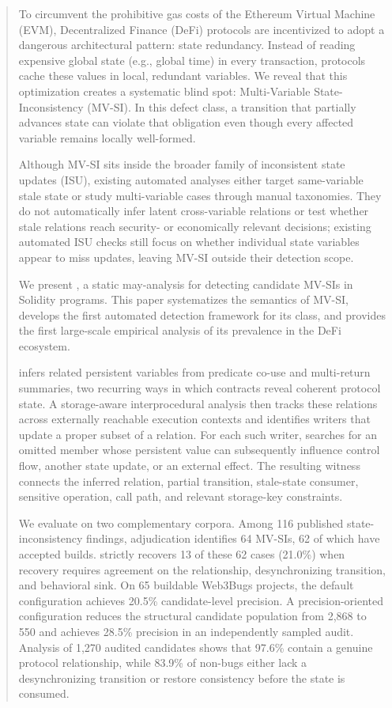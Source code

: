 \begin{abstract}

To circumvent the prohibitive gas costs of the Ethereum Virtual Machine (EVM), Decentralized Finance (DeFi) protocols are incentivized to adopt a dangerous architectural pattern: state redundancy. Instead of reading expensive global state (e.g., global time) in every transaction, protocols cache these values in local, redundant variables. We reveal that this optimization creates a systematic blind spot: Multi-Variable State-Inconsistency (MV-SI). In this defect class, a transition that partially advances state can violate that obligation even though every affected variable remains locally well-formed.

Although MV-SI sits inside the broader family of inconsistent state updates (ISU), existing automated analyses either target same-variable stale state or study multi-variable cases through manual taxonomies. They do not automatically infer latent cross-variable relations or test whether stale relations reach security- or economically relevant decisions; existing automated ISU checks still focus on whether individual state variables appear to miss updates, leaving MV-SI outside their detection scope.

We present \tool, a static may-analysis for detecting candidate MV-SIs in Solidity programs. This paper systematizes the semantics of MV-SI, develops the first automated detection framework for its class, and provides the first large-scale empirical analysis of its prevalence in the DeFi ecosystem.

\tool infers related persistent variables from predicate co-use and multi-return summaries, two recurring ways in which contracts reveal coherent protocol state. A storage-aware interprocedural analysis then tracks these relations across externally reachable execution contexts and identifies writers that update a proper subset of a relation. For each such writer, \tool searches for an omitted member whose persistent value can subsequently influence control flow, another state update, or an external effect. The resulting witness connects the inferred relation, partial transition, stale-state consumer, sensitive operation, call path, and relevant storage-key constraints.

We evaluate \tool on two complementary corpora. Among 116 published state-inconsistency findings, adjudication identifies 64 MV-SIs, 62 of which have accepted builds. \tool strictly recovers 13 of these 62 cases (21.0\%) when recovery requires agreement on the relationship, desynchronizing transition, and behavioral sink. On 65 buildable Web3Bugs projects, the default configuration achieves 20.5\% candidate-level precision. A precision-oriented configuration reduces the structural candidate population from 2,868 to 550 and achieves 28.5\% precision in an independently sampled audit. Analysis of 1,270 audited candidates shows that 97.6\% contain a genuine protocol relationship, while 83.9\% of non-bugs either lack a desynchronizing transition or restore consistency before the state is consumed.

\end{abstract}
